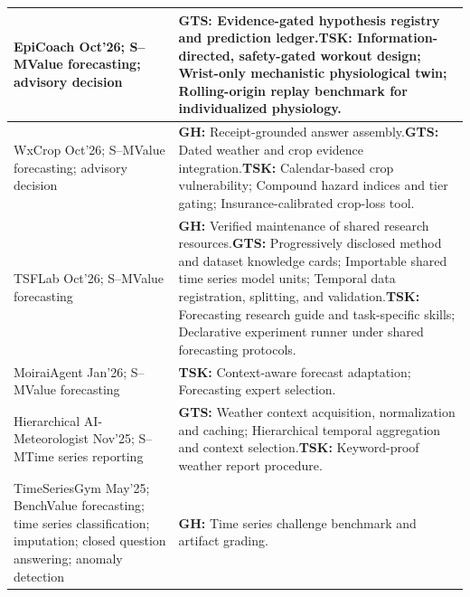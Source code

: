 \documentclass[preprints,article,submit,moreauthors]{Definitions/mdpi}
\newcommand{\typeSMshort}{\textsf{S--M}}
\newcommand{\typeBenchshort}{\textsf{Bench}}
\begin{document}
\begin{longtable}{@{}>{\raggedright\arraybackslash}p{}p{}@{}}
EpiCoach \citep{epicoach2026} Oct'26; \typeSMshort{}\newline Value forecasting; advisory decision & \textbf{GTS:} Evidence-gated hypothesis registry and prediction ledger.\newline\textbf{TSK:} Information-directed, safety-gated workout design; Wrist-only mechanistic physiological twin; Rolling-origin replay benchmark for individualized physiology.\\\midrule
WxCrop \citep{wxcrop2026} Oct'26; \typeSMshort{}\newline Value forecasting; advisory decision & \textbf{GH:} Receipt-grounded answer assembly.\newline\textbf{GTS:} Dated weather and crop evidence integration.\newline\textbf{TSK:} Calendar-based crop vulnerability; Compound hazard indices and tier gating; Insurance-calibrated crop-loss tool.\\\midrule
TSFLab \citep{tsflab2026} Oct'26; \typeSMshort{}\newline Value forecasting & \textbf{GH:} Verified maintenance of shared research resources.\newline\textbf{GTS:} Progressively disclosed method and dataset knowledge cards; Importable shared time series model units; Temporal data registration, splitting, and validation.\newline\textbf{TSK:} Forecasting research guide and task-specific skills; Declarative experiment runner under shared forecasting protocols.\\\midrule
MoiraiAgent \citep{moiraiagent2026} Jan'26; \typeSMshort{}\newline Value forecasting & \textbf{TSK:} Context-aware forecast adaptation; Forecasting expert selection.\\\midrule
Hierarchical AI-Meteorologist \citep{hierarchicalmeteorologist2025} Nov'25; \typeSMshort{}\newline Time series reporting & \textbf{GTS:} Weather context acquisition, normalization and caching; Hierarchical temporal aggregation and context selection.\newline\textbf{TSK:} Keyword-proof weather report procedure.\\\midrule
TimeSeriesGym \citep{timeseriesgym2025} May'25; \typeBenchshort{}\newline Value forecasting; time series classification; imputation; closed question answering; anomaly detection & \textbf{GH:} Time series challenge benchmark and artifact grading.\\\midrule

\end{longtable}
\end{document}
